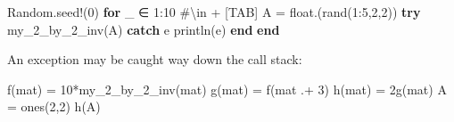 \documentclass[
]{article}
\newenvironment{Shaded}{\begin{snugshade}}{\end{snugshade}}
\newcommand{\BuiltInTok}[1]{\textcolor[rgb]{0.00,0.23,0.31}{#1}}
\newcommand{\CommentTok}[1]{\textcolor[rgb]{0.37,0.37,0.37}{#1}}
\newcommand{\ConstantTok}[1]{\textcolor[rgb]{0.56,0.35,0.01}{#1}}
\newcommand{\ControlFlowTok}[1]{\textcolor[rgb]{0.00,0.23,0.31}{\textbf{#1}}}
\newcommand{\FloatTok}[1]{\textcolor[rgb]{0.68,0.00,0.00}{#1}}
\newcommand{\FunctionTok}[1]{\textcolor[rgb]{0.28,0.35,0.67}{#1}}
\newcommand{\NormalTok}[1]{\textcolor[rgb]{0.00,0.23,0.31}{#1}}
\newcommand{\OperatorTok}[1]{\textcolor[rgb]{0.37,0.37,0.37}{#1}}
\begin{document}
\begin{Shaded}
\begin{Highlighting}[]
\BuiltInTok{Random}\NormalTok{.}\FunctionTok{seed!}\NormalTok{(}\FloatTok{0}\NormalTok{)}
\ControlFlowTok{for}\NormalTok{ \_ }\OperatorTok{∈} \FloatTok{1}\OperatorTok{:}\FloatTok{10} \CommentTok{\#\textbackslash{}in + [TAB]}
\NormalTok{   A }\OperatorTok{=} \FunctionTok{float}\NormalTok{.(}\FunctionTok{rand}\NormalTok{(}\FloatTok{1}\OperatorTok{:}\FloatTok{5}\NormalTok{,}\FloatTok{2}\NormalTok{,}\FloatTok{2}\NormalTok{))}
   \ControlFlowTok{try}
   \FunctionTok{my\_2\_by\_2\_inv}\NormalTok{(A)}
   \ControlFlowTok{catch} \ConstantTok{e}
   \FunctionTok{println}\NormalTok{(}\ConstantTok{e}\NormalTok{)}
   \ControlFlowTok{end}
\ControlFlowTok{end}
\end{Highlighting}
\end{Shaded}

An exception may be caught way down the call stack:

\begin{Shaded}
\begin{Highlighting}[]
\FunctionTok{f}\NormalTok{(mat) }\OperatorTok{=} \FloatTok{10}\FunctionTok{*my\_2\_by\_2\_inv}\NormalTok{(mat)}
\FunctionTok{g}\NormalTok{(mat) }\OperatorTok{=} \FunctionTok{f}\NormalTok{(mat }\OperatorTok{.+} \FloatTok{3}\NormalTok{)}
\FunctionTok{h}\NormalTok{(mat) }\OperatorTok{=} \FloatTok{2}\FunctionTok{g}\NormalTok{(mat)}
\NormalTok{A }\OperatorTok{=} \FunctionTok{ones}\NormalTok{(}\FloatTok{2}\NormalTok{,}\FloatTok{2}\NormalTok{)}
\FunctionTok{h}\NormalTok{(A)}
\end{Highlighting}
\end{Shaded}
\end{document}
